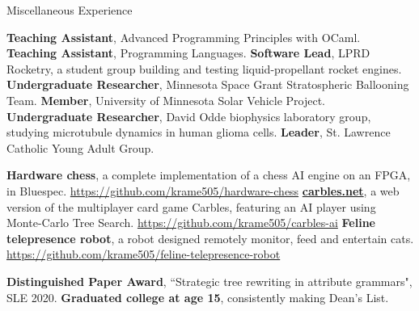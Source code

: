 \begin{rubric}{Miscellaneous Experience}

\entry*[2018] \textbf{Teaching Assistant}, Advanced Programming Principles with OCaml.
\entry*[2016] \textbf{Teaching Assistant}, Programming Languages.
\entry*[2016 -- 2020] \textbf{Software Lead}, LPRD Rocketry, a student group building and testing liquid-propellant rocket engines.
\entry*[2013 -- 2015] \textbf{Undergraduate Researcher}, Minnesota Space Grant Stratospheric Ballooning Team.
\entry*[2011 -- 2015] \textbf{Member}, University of Minnesota Solar Vehicle Project.
\entry*[2012] \textbf{Undergraduate Researcher}, David Odde biophysics laboratory group, studying microtubule dynamics in human glioma cells.
\entry*[2022 -- 2023] \textbf{Leader}, St. Lawrence Catholic Young Adult Group.

\entry*[2022] \textbf{Hardware chess}, a complete implementation of a chess AI engine on an FPGA, in Bluespec.
\url{https://github.com/krame505/hardware-chess}
\entry*[2020] \textbf{\href{https://carbles.net}{carbles.net}}, a web version of the multiplayer card game Carbles, featuring an AI player using Monte-Carlo Tree Search.
\url{https://github.com/krame505/carbles-ai}
\entry*[2020] \textbf{Feline telepresence robot}, a robot designed remotely monitor, feed and entertain cats.
\url{https://github.com/krame505/feline-telepresence-robot}


\entry*[2020] \textbf{Distinguished Paper Award}, “Strategic tree rewriting in attribute grammars", SLE 2020.
%
\entry*[2015] \textbf{Graduated college at age 15}, consistently making Dean's List.

\end{rubric}